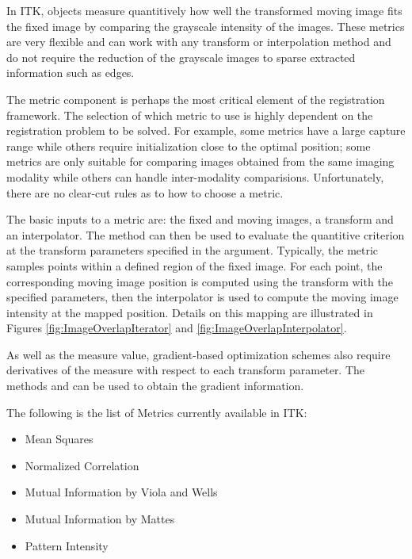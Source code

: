%
%
%
%


In ITK,  objects measure quantitively how well
the transformed moving image fits the fixed image by comparing the grayscale
intensity of the images. These metrics are very flexible and can work with any
transform or interpolation method and do not require the reduction of the
grayscale images to sparse extracted information such as edges.

The metric component is perhaps the most critical element of the registration
framework. The selection of which metric to use is highly dependent on the
registration problem to be solved. For example, some metrics have a large
capture range while others require initialization close to the optimal
position; some metrics are only suitable for comparing images obtained from the
same imaging modality while others can handle inter-modality comparisions.
Unfortunately, there are no clear-cut rules as to how to choose a metric.


The basic inputs to a metric are: the fixed and moving images, a transform and
an interpolator. The method  can then be used to evaluate the
quantitive criterion at the transform parameters specified in the argument.
Typically, the metric samples points within a defined region of the fixed
image.  For each point, the corresponding moving image position is computed
using the transform with the specified parameters, then the interpolator is
used to compute the moving image intensity at the mapped position. Details on
this mapping are illustrated in Figures \ref{fig:ImageOverlapIterator} and
\ref{fig:ImageOverlapInterpolator}. 

As well as the measure value, gradient-based optimization schemes also require
derivatives of the measure with respect to each transform parameter. The
methods  and  can be used
to obtain the gradient information.


The following is the list of Metrics currently available in ITK:
\begin{itemize}
\item Mean Squares
\item Normalized Correlation
\item Mutual Information by Viola and Wells
\item Mutual Information by Mattes
\item Pattern Intensity
\end{itemize}

